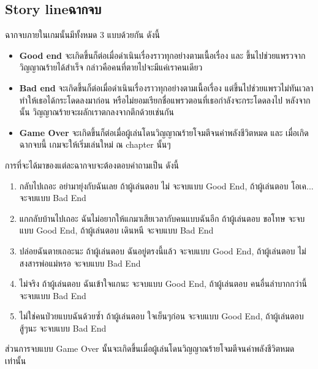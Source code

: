 \subsection{\ifenglish Story line\else ฉากจบ\fi }
ฉากจบภายในเกมนั้นมีทั้งหมด 3 แบบด้วยกัน ดังนี้
\begin{itemize}
    \item \textbf{Good end} จะเกิดขึ้นก็ต่อเมื่อดำเนินเรื่องราวทุกอย่างตามเนื้อเรื่อง และ ขึ้นไปช่วยแพรวจากวิญญาณร้ายได้สำเร็จ กล่าวคือคนที่ตายไปจะมีแค่เราคนเดียว
    \item \textbf{Bad end} จะเกิดขึ้นก็ต่อเมื่อดำเนินเรื่องราวทุกอย่างตามเนื้อเรื่อง แต่ขึ้นไปช่วยแพรวไม่ทันเวลา ทำให้เธอได้กระโดดลงมาก่อน หรือไม่ยอมเรียกชื่อแพรวตอนที่เธอกำลังจะกระโดดลงไป หลังจากนั้น วิญญาณร้ายจะผลักเราตกลงจากตึกด้วยเช่นกัน
    \item \textbf{Game Over} จะเกิดขึ้นก็ต่อเมื่อผู้เล่นโดนวิญญาณร้ายโจมตีจนค่าพลังชีวิตหมด และ เมื่อเกิดฉากจบนี้ เกมจะให้เริ่มเล่นใหม่ ณ chapter นั้นๆ
\end{itemize}
การที่จะได้มาของแต่ละฉากจบจะต้องตอบคำถามเป็น ดังนี้
\begin{enumerate}
    \item กลับไปเถอะ อย่ามายุ่งกับฉันเลย ถ้าผู้เล่นตอบ ไม่ จะจบแบบ Good End, ถ้าผู้เล่นตอบ โอเค... จะจบแบบ Bad End
    \item แกกลับบ้านไปเถอะ ฉันไม่อยากให้แกมาเสียเวลากับคนแบบฉันอีก ถ้าผู้เล่นตอบ ขอโทษ จะจบแบบ Good End, ถ้าผู้เล่นตอบ เดินหนี จะจบแบบ Bad End
    \item ปล่อยฉันตายเถอะนะ ถ้าผู้เล่นตอบ ฉันอยู่ตรงนี้แล้ว จะจบแบบ Good End, ถ้าผู้เล่นตอบ ไม่สงสารพ่อแม่หรอ จะจบแบบ Bad End
    \item ไม่จริง ถ้าผู้เล่นตอบ ฉันเข้าใจแกนะ จะจบแบบ Good End, ถ้าผู้เล่นตอบ คนอื่นลำบากกว่านี้ จะจบแบบ Bad End
    \item ไม่ใช่คนป่วยแบบฉันด้วยซ้ำ ถ้าผู้เล่นตอบ ใจเย็นๆก่อน จะจบแบบ Good End, ถ้าผู้เล่นตอบ สู้ๆนะ จะจบแบบ Bad End
\end{enumerate}
ส่วนการจบแบบ Game Over นั้นจะเกิดขึ้นเมื่อผู้เล่นโดนวิญญาณร้ายโจมตีจนค่าพลังชีวิตหมดเท่านั้น 


